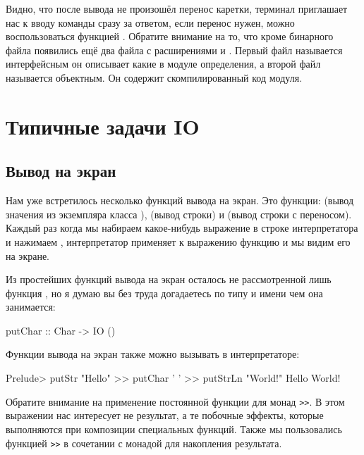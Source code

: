 
Видно, что после вывода не произошёл перенос каретки,
терминал приглашает нас к вводу команды сразу за ответом,
если перенос нужен, можно воспользоваться функцией .
Обратите внимание на то, что кроме бинарного файла 
появились ещё два файла с расширениями  и . Первый
файл называется интерфейсным он описывает какие в модуле 
определения, а второй файл называется объектным. Он содержит
скомпилированный код модуля. 

\section{Типичные задачи IO}

\subsection{Вывод на экран}

Нам уже встретилось несколько функций вывода на экран.
Это функции:  (вывод значения из экземпляра класса ),
 (вывод строки) и  (вывод строки с переносом).
Каждый раз когда мы набираем какое-нибудь выражение в строке
интерпретатора и нажимаем , интерпретатор применяет
к выражению функцию  и мы видим его на экране.

Из простейших функций вывода на экран осталось не рассмотренной
лишь функция , но я думаю вы без труда догадаетесь
по типу и имени чем она занимается:

\begin{code}
putChar :: Char -> IO ()
\end{code}

Функции вывода на экран также можно вызывать в интерпретаторе:


\begin{code}
Prelude> putStr "Hello" >> putChar ' ' >> putStrLn "World!" 
Hello World!
\end{code}

Обратите внимание на применение постоянной функции для монад
\verb!>>!. В этом выражении нас интересует не результат, 
а те побочные эффекты, которые выполняются при композиции
специальных функций. Также мы пользовались функцией \verb!>>!
в сочетании с монадой  для накопления результата.

